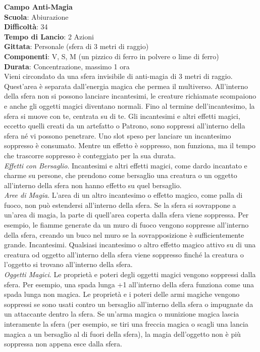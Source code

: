 \begin{multicols}{2}
\medskip\textbf{Campo Anti-Magia}\\
\textbf{Scuola}: Abiurazione\\
\textbf{Difficoltà}: 34\\
\textbf{Tempo di Lancio}: 2 Azioni\\
\textbf{Gittata}: Personale (sfera di 3 metri di raggio)\\
\textbf{Componenti}: V, S, M (un pizzico di ferro in polvere o lime di ferro)\\
\textbf{Durata}: Concentrazione, massimo 1 ora\\
Vieni circondato da una sfera invisibile di anti-magia di 3 metri di raggio. Quest'area è separata dall'energia magica che permea il multiverso. All'interno della sfera non si possono lanciare incantesimi, le creature richiamate scompaiono e anche gli oggetti magici diventano normali. Fino al termine dell'incantesimo, la sfera si muove con te, centrata su di te. Gli incantesimi e altri effetti magici, eccetto quelli creati da un artefatto o Patrono, sono soppressi all'interno della sfera né vi possono penetrare. Uno slot speso per lanciare un incantesimo soppresso è consumato. Mentre un effetto è soppresso, non funziona, ma il tempo che trascorre soppresso è conteggiato per la sua durata. 
\\\textit{Effetti con Bersaglio}. Incantesimi e altri effetti magici, come dardo incantato e charme su persone, che prendono come bersaglio una creatura o un oggetto all'interno della sfera non hanno effetto su quel bersaglio.
\\\textit{Aree di Magia}. L'area di un altro incantesimo o effetto magico, come palla di fuoco, non può estendersi all'interno della sfera. Se la sfera si sovrappone a un'area di magia, la parte di quell'area coperta dalla sfera viene soppressa. Per esempio, le fiamme generate da un muro di fuoco vengono soppresse all'interno della sfera, creando un buco nel muro se la sovrapposizione è sufficientemente grande. Incantesimi. Qualsiasi incantesimo o altro effetto magico attivo su di una creatura od oggetto all'interno della sfera viene soppresso finché la creatura o l'oggetto si trovano all'interno della sfera.\\
\textit{Oggetti Magici}. Le proprietà e poteri degli oggetti magici vengono soppressi dalla sfera. Per esempio, una spada lunga +1 all'interno della sfera funziona come una spada lunga non magica. Le proprietà e i poteri delle armi magiche vengono soppressi se sono usati contro un bersaglio all'interno della sfera o impugnate da un attaccante dentro la sfera. Se un'arma magica o munizione magica lascia interamente la sfera (per esempio, se tiri una freccia magica o scagli una lancia magica a un bersaglio al di fuori della sfera), la magia dell'oggetto non è più soppressa non appena esce dalla sfera.

\end{multicols}
